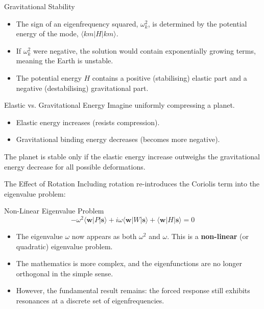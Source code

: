\documentclass{beamer}
\begin{document}
\begin{frame}{Gravitational Stability}
    \begin{itemize}
        \item The sign of an eigenfrequency squared, $\omega_k^2$, is determined by the potential energy of the mode, $\langle km|H|km\rangle$.
        \pause
        \item If $\omega_k^2$ were negative, the solution would contain exponentially growing terms, meaning the Earth is unstable.
        \pause
        \item The potential energy $H$ contains a positive (stabilising) elastic part and a negative (destabilising) gravitational part.
    \end{itemize}
    \pause
    \begin{exampleblock}{Elastic vs. Gravitational Energy}
        Imagine uniformly compressing a planet.
        \begin{itemize}
            \item Elastic energy increases (resists compression).
            \item Gravitational binding energy decreases (becomes more negative).
        \end{itemize}
        The planet is stable only if the elastic energy increase outweighs the gravitational energy decrease for all possible deformations.
    \end{exampleblock}
\end{frame}


\begin{frame}{The Effect of Rotation}
    Including rotation re-introduces the Coriolis term into the eigenvalue problem:
    \begin{alertblock}{Non-Linear Eigenvalue Problem}
         $$ -\omega^{2}\langle \mathbf{w}|P|\mathbf{s}\rangle + i\omega\langle \mathbf{w}|W|\mathbf{s}\rangle + \langle \mathbf{w}|H|\mathbf{s}\rangle = 0 $$
    \end{alertblock}
    \pause
    \begin{itemize}
        \item The eigenvalue $\omega$ now appears as both $\omega^2$ and $\omega$. This is a \textbf{non-linear} (or quadratic) eigenvalue problem.
        \pause
        \item The mathematics is more complex, and the eigenfunctions are no longer orthogonal in the simple sense.
        \pause
        \item However, the fundamental result remains: the forced response still exhibits resonances at a discrete set of eigenfrequencies.
    \end{itemize}
\end{frame}
\end{document}
